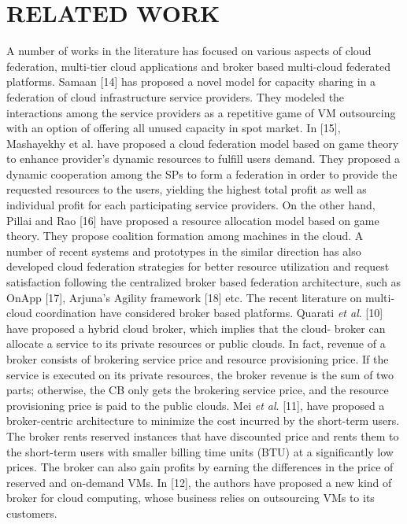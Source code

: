 \documentclass[conference]{IEEEtran}
\newcommand\tab[1][0.8cm]{\hspace*{#1}}
\begin{document}
\section{RELATED WORK}
\tab A number of works in the literature has focused on various
aspects of cloud federation, multi-tier cloud applications and
broker based multi-cloud federated platforms. Samaan [14] has
proposed a novel model for capacity sharing in a federation
of cloud infrastructure service providers. They modeled the
interactions among the service providers as a repetitive game
of VM outsourcing with an option of offering all unused
capacity in spot market. In [15], Mashayekhy et al. have
proposed a cloud federation model based on game theory to
enhance provider’s dynamic resources to fulfill users demand.
They proposed a dynamic cooperation among the SPs to form
a federation in order to provide the requested resources to the
users, yielding the highest total profit as well as individual
profit for each participating service providers. On the other
hand, Pillai and Rao [16] have proposed a resource allocation
model based on game theory. They propose coalition formation
among machines in the cloud. A number of recent systems and
prototypes in the similar direction has also developed cloud
federation strategies for better resource utilization and request
satisfaction following the centralized broker based federation
architecture, such as OnApp [17], Arjuna’s Agility framework
[18] etc.
\newline
\tab The recent literature on multi-cloud coordination have
considered broker based platforms. Quarati \emph{et al}. [10] have
proposed a hybrid cloud broker, which implies that the cloud-
broker can allocate a service to its private resources or public
clouds. In fact, revenue of a broker consists of brokering
service price and resource provisioning price. If the service
is executed on its private resources, the broker revenue is the
sum of two parts; otherwise, the CB only gets the brokering
service price, and the resource provisioning price is paid to the
public clouds. Mei \emph{et al}. [11], have proposed a broker-centric
architecture to minimize the cost incurred by the short-term
users. The broker rents reserved instances that have discounted
price and rents them to the short-term users with smaller
billing time units (BTU) at a significantly low prices. The
broker can also gain profits by earning the differences in the
price of reserved and on-demand VMs. In [12], the authors
have proposed a new kind of broker for cloud computing,
whose business relies on outsourcing VMs to its customers.
\end{document}

